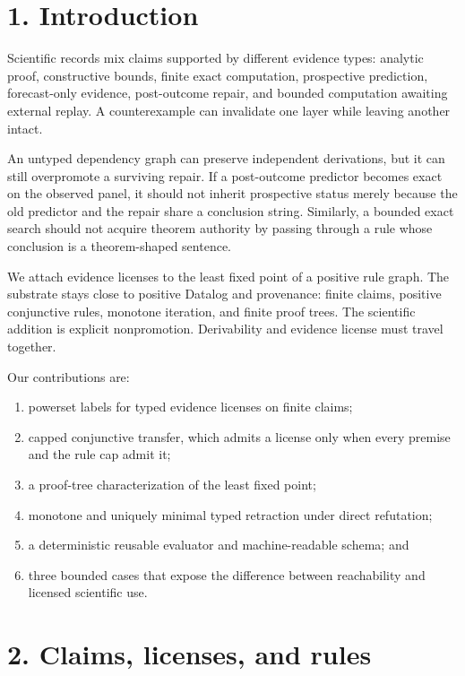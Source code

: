 \documentclass[
  11pt,
]{article}
\providecommand{\tightlist}{%
  \setlength{\itemsep}{0pt}\setlength{\parskip}{0pt}}
\begin{document}
\hypertarget{introduction}{%
\section{1. Introduction}\label{introduction}}

Scientific records mix claims supported by different evidence types:
analytic proof, constructive bounds, finite exact computation,
prospective prediction, forecast-only evidence, post-outcome repair, and
bounded computation awaiting external replay. A counterexample can
invalidate one layer while leaving another intact.

An untyped dependency graph can preserve independent derivations, but it
can still overpromote a surviving repair. If a post-outcome predictor
becomes exact on the observed panel, it should not inherit prospective
status merely because the old predictor and the repair share a
conclusion string. Similarly, a bounded exact search should not acquire
theorem authority by passing through a rule whose conclusion is a
theorem-shaped sentence.

We attach evidence licenses to the least fixed point of a positive rule
graph. The substrate stays close to positive Datalog and provenance:
finite claims, positive conjunctive rules, monotone iteration, and
finite proof trees. The scientific addition is explicit nonpromotion.
Derivability and evidence license must travel together.

Our contributions are:

\begin{enumerate}
\def\labelenumi{\arabic{enumi}.}
\tightlist
\item
  powerset labels for typed evidence licenses on finite claims;
\item
  capped conjunctive transfer, which admits a license only when every
  premise and the rule cap admit it;
\item
  a proof-tree characterization of the least fixed point;
\item
  monotone and uniquely minimal typed retraction under direct
  refutation;
\item
  a deterministic reusable evaluator and machine-readable schema; and
\item
  three bounded cases that expose the difference between reachability
  and licensed scientific use.
\end{enumerate}

\hypertarget{claims-licenses-and-rules}{%
\section{2. Claims, licenses, and
rules}\label{claims-licenses-and-rules}}
\end{document}
